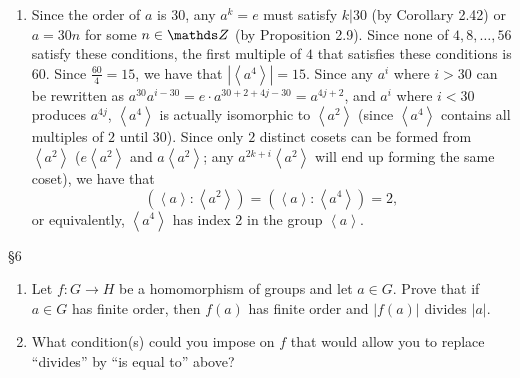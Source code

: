 \documentclass{homework}
\begin{document}
\begin{solution}
\begin{enumerate}[label=(\alph*)]
    \item Since the order of $a$ is $30$, any $a^{k}=e$ must satisfy $k|30$ (by Corollary 2.42) or
      $a=30n$ for some $n\in \Z$ (by Proposition 2.9). Since none of $4,8,\ldots,56$ satisfy these
      conditions, the first multiple of $4$ that satisfies these conditions is $60$. Since
      $\frac{60}{4}=15$, we have that $\left| \left<a^{4} \right> \right| =15 $. Since any
      $a^{i}$ where $i>30$ can be rewritten as $a^{30}a^{i-30}=e\cdot a^{30+2+4j-30}=a^{4j+2}$, and
      $a^{i}$ where $i<30$ produces $a^{4j}$, $\left<a^{4} \right>$ is actually isomorphic to
      $\left<a^2 \right>$ (since $\left<a^{4} \right>$ contains all multiples of $2$ until $30$).
      Since only $2$ distinct cosets can be formed from $\left<a^2 \right>$ ($e\left<a^2 \right>$
      and $a\left<a^2 \right>$; any $a^{2k+i}\left<a^2 \right>$ will end up forming the same coset),
      we have that \[
        \left( \left<a \right>:\left<a^2 \right> \right)= \left( \left<a \right>:\left<a^{4} \right>
        \right) =2
      ,\] or equivalently, $\left<a^{4} \right>$ has index $2$ in the group $\left<a \right>$.
  \end{enumerate}
\end{solution}

\begin{problem}{\S 6}
  \begin{enumerate}[label=(\alph*)]
    \item Let $ f: G \to H$ be a homomorphism of groups and let $a\in G$. Prove that if $a\in G$ 
      has finite order, then $f(a)$ has finite order and $\left| f(a) \right| $ divides $\left| a
      \right| $.
    \item What condition(s) could you impose on $f$ that would allow you to replace ``divides'' by
      ``is equal to'' above?
  \end{enumerate}
\end{problem}
\end{document}
